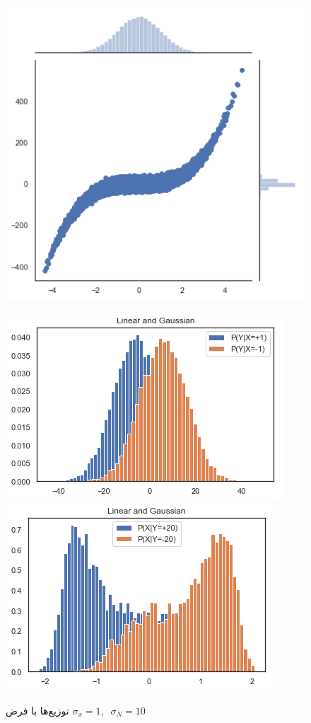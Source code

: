 \documentclass{article}
\begin{document}
\begin{itemize}
\begin{figure}[h]
\centering
\includegraphics[scale=0.35]{non_con1.png}
\begin{floatrow}
\includegraphics[scale=0.35]{non_cond2.png}
\includegraphics[scale=0.35]{non_cond3.png}
\end{floatrow}
\caption{توزیع‌ها با فرض 	
$\sigma_x =1,\;\; \sigma_N = 10$}
\label{2}
\end{figure}
\end{itemize}
\end{document}

